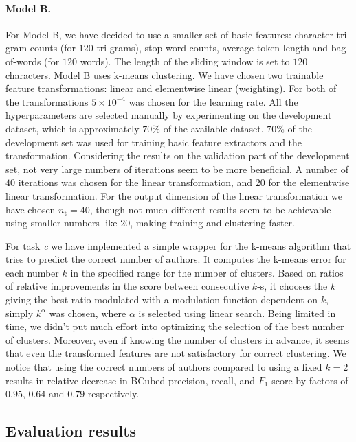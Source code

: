 \documentclass[10pt, a4paper]{article}
\begin{document}
\paragraph{Model B.} For Model B, we have decided to use a smaller set of basic features: character tri-gram counts (for $120$ tri-grams), stop word counts, average token length and bag-of-words (for $120$ words). The length of the sliding window is set to $120$ characters. Model B uses k-means clustering. We have chosen two trainable feature transformations: linear and elementwise linear (weighting). For both of the transformations $5\times 10^{-4}$ was chosen for the learning rate. All the hyperparameters are selected manually by experimenting on the development dataset, which is approximately $70\%$ of the available dataset. $70\%$ of the development set was used for training basic feature extractors and the transformation. Considering the results on the validation part of the development set, not very large numbers of iterations seem to be more beneficial. A number of $40$ iterations was chosen for the linear transformation, and $20$ for the elementwise linear transformation. For the output dimension of the linear transformation we have chosen $n_\mathrm{t}=40$, though not much different results seem to be achievable using smaller numbers like $20$, making training and clustering faster. 

For task \emph{c} we have implemented a simple wrapper for the k-means algorithm that tries to predict the correct number of authors. It computes the k-means error for each number $k$ in the specified range for the number of clusters. Based on ratios of relative improvements in the score between consecutive $k$-s, it chooses the $k$ giving the best ratio modulated with a modulation function dependent on $k$, simply $k^\alpha$ was chosen, where $\alpha$ is selected using linear search. Being limited in time, we didn't put much effort into optimizing the selection of the best number of clusters. Moreover, even if knowing the number of clusters in advance, it seems that even the transformed features are not satisfactory for correct clustering. We notice that using the correct numbers of authors compared to using a fixed $k=2$ results in relative decrease in BCubed precision, recall, and $F_1$-score by factors of $0.95$, $0.64$ and $0.79$ respectively.

\subsection{Evaluation results}
\end{document}
